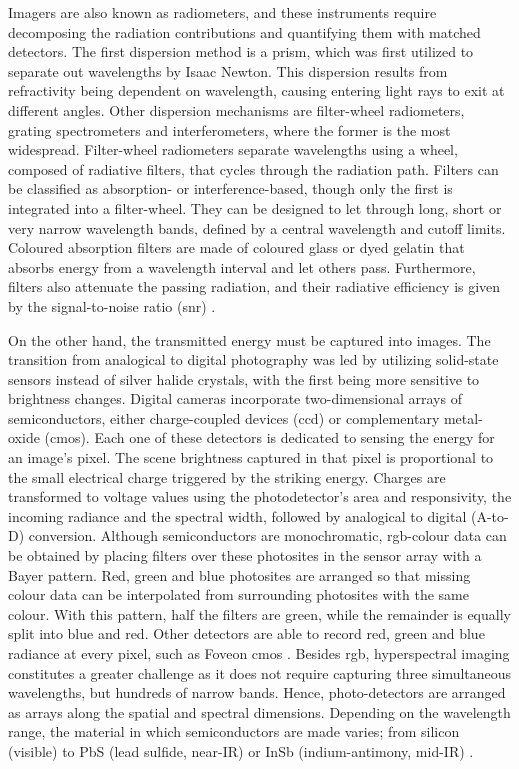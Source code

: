 Imagers are also known as radiometers, and these instruments require decomposing the radiation contributions and quantifying them with matched detectors. The first dispersion method is a prism, which was first utilized to separate out wavelengths by Isaac Newton. This dispersion results from refractivity being dependent on wavelength, causing entering light rays to exit at different angles. Other dispersion mechanisms are filter-wheel radiometers, grating spectrometers and interferometers, where the former is the most widespread. Filter-wheel radiometers separate wavelengths using a wheel, composed of radiative filters, that cycles through the radiation path. Filters can be classified as absorption- or interference-based, though only the first is integrated into a filter-wheel. They can be designed to let through long, short or very narrow wavelength bands, defined by a central wavelength and cutoff limits. Coloured absorption filters are made of coloured glass or dyed gelatin that absorbs energy from a wavelength interval and let others pass. Furthermore, filters also attenuate the passing radiation, and their radiative efficiency is given by the signal-to-noise ratio (\acrshort{snr}) \cite{emery_introduction_2017}.

On the other hand, the transmitted energy must be captured into images. The transition from analogical to digital photography was led by utilizing solid-state sensors instead of silver halide crystals, with the first being more sensitive to brightness changes. Digital cameras incorporate two-dimensional arrays of semiconductors, either charge-coupled devices (\acrshort{ccd}) or complementary metal-oxide (\acrshort{cmos}). Each one of these detectors is dedicated to sensing the energy for an image's pixel. The scene brightness captured in that pixel is proportional to the small electrical charge triggered by the striking energy. Charges are transformed to voltage values using the photodetector's area and responsivity, the incoming radiance and the spectral width, followed by analogical to digital (A-to-D) conversion. Although semiconductors are monochromatic, \acrshort{rgb}-colour data can be obtained by placing filters over these photosites in the sensor array with a Bayer pattern. Red, green and blue photosites are arranged so that missing colour data can be interpolated from surrounding photosites with the same colour. With this pattern, half the filters are green, while the remainder is equally split into blue and red. Other detectors are able to record red, green and blue radiance at every pixel, such as Foveon \acrshort{cmos} \cite{lillesand_remote_2015}. Besides \acrshort{rgb}, hyperspectral imaging constitutes a greater challenge as it does not require capturing three simultaneous wavelengths, but hundreds of narrow bands. Hence, photo-detectors are arranged as arrays along the spatial and spectral dimensions. Depending on the wavelength range, the material in which semiconductors are made varies; from silicon (visible) to PbS (lead sulfide, near-IR) or InSb (indium-antimony, mid-IR) \cite{emery_introduction_2017}. 

